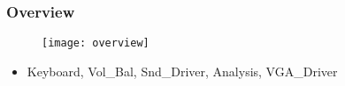 \begin{frame}
  \frametitle{Overview}
    \begin{figure}
      \centering
      \texttt{[image: overview]}
    \end{figure}


    \begin{itemize}
      \item Keyboard, Vol\_Bal, Snd\_Driver, Analysis, VGA\_Driver
    \end{itemize}

\end{frame}
